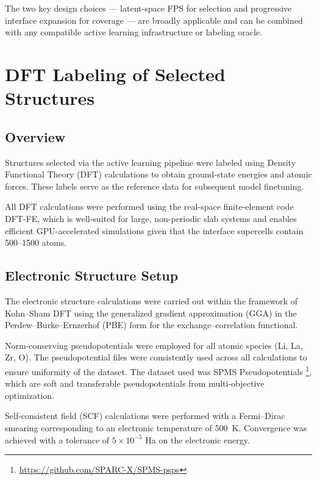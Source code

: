 \documentclass[12pt,a4paper,oneside]{book}
\begin{document}
The two key design choices --- latent-space FPS for selection and
progressive interface expansion for coverage --- are broadly applicable
and can be combined with any compatible active learning infrastructure
or labeling oracle.

\section{DFT Labeling of Selected Structures}
\label{sec:dft_labeling}

\subsection{Overview}

Structures selected via the active learning pipeline were labeled using Density Functional Theory (DFT) calculations to obtain ground-state energies and atomic forces. These labels serve as the reference data for subsequent model finetuning.

All DFT calculations were performed using the real-space finite-element code \textsc{DFT-FE}, which is well-suited for large, non-periodic slab systems and enables efficient GPU-accelerated simulations given that the interface supercells contain 500--1500 atoms.

\subsection{Electronic Structure Setup}

The electronic structure calculations were carried out within the framework of Kohn--Sham DFT using the generalized gradient approximation (GGA) in the Perdew--Burke--Ernzerhof (PBE) form for the exchange--correlation functional.

Norm-conserving pseudopotentials were employed for all atomic species (Li, La, Zr, O). The pseudopotential files were consistently used across all calculations to ensure uniformity of the dataset. The dataset used was SPMS Pseudopotentials \footnote{\url{https://github.com/SPARC-X/SPMS-psps}}, which are soft and transferable pseudopotentials from multi-objective optimization.

Self-consistent field (SCF) calculations were performed with a Fermi--Dirac smearing corresponding to an electronic temperature of 500~K. Convergence was achieved with a tolerance of $5 \times 10^{-5}$ Ha on the electronic energy.
\end{document}
